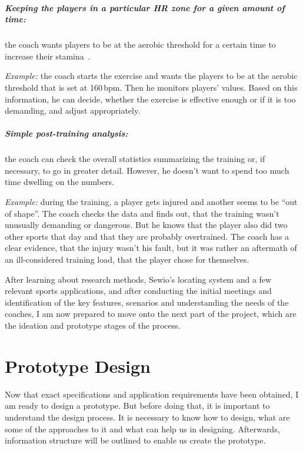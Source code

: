 \paragraph{Keeping the players in a particular HR zone for a given amount of time:} the coach wants players to be at the aerobic threshold for a certain time to increase their stamina~\cite{Aerobic}.

{\it Example:} the coach starts the exercise and wants the players to be at the aerobic threshold that is set at 160\,bpm. Then he monitors players’ values. Based on this information, he can decide, whether the exercise is effective enough or if it is too demanding, and adjust appropriately.

\paragraph{Simple post-training analysis:} the coach can check the overall statistics summarizing the training or, if necessary, to go in greater detail. However, he doesn’t want to spend too much time dwelling on the numbers.

{\it Example:} during the training, a player gets injured and another seems to be “out of shape”. The coach checks the data and finds out, that the training wasn’t unusually demanding or dangerous. But he knows that the player also did two other sports that day and that they are probably overtrained. The coach has a clear evidence, that the injury wasn’t his fault, but it was rather an aftermath of an ill-considered training load, that the player chose for themselves.

\bigskip
After learning about research methods, Sewio’s locating system and a few relevant sports applications, and after conducting the initial meetings and identification of the key features, scenarios and understanding the needs of the coaches, I am now prepared to move onto the next part of the project, which are the ideation and prototype stages of the process.


\chapter{Prototype Design}\label{design}
Now that exact specifications and application requirements have been obtained, I am ready to design a prototype. But before doing that, it is important to understand the design process. It is necessary to know how to design, what are some of the approaches to it and what can help us in designing. Afterwards, information structure will be outlined to enable us create the prototype. 

